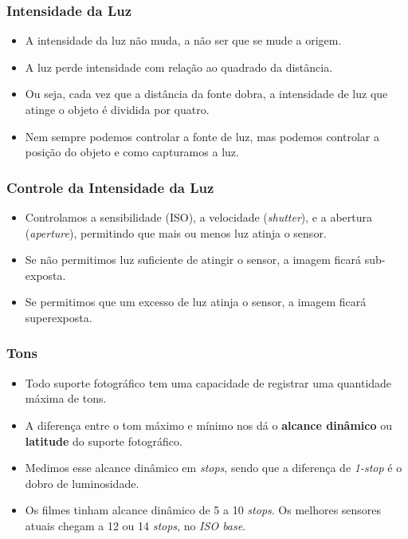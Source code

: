 
\begin{frame}
    \frametitle{Intensidade da Luz}
    \begin{itemize}
      \item A intensidade da luz não muda, a não ser que se mude a origem.
      \item A luz perde intensidade com relação ao quadrado da distância.
      \item Ou seja, cada vez que a distância da fonte dobra, a intensidade
      de luz que atinge o objeto é dividida por quatro.
      \item Nem sempre podemos controlar a fonte de luz, mas podemos controlar
      a posição do objeto e como capturamos a luz.
    \end{itemize}
\end{frame}

\begin{frame}
    \frametitle{Controle da Intensidade da Luz}
    \begin{itemize}
      \item Controlamos a sensibilidade (ISO), a velocidade (\textit{shutter}),
      e a abertura (\textit{aperture}), permitindo que mais ou menos luz atinja o sensor.
      \item Se não permitimos luz suficiente de atingir o sensor, a imagem ficará sub-exposta.
      \item Se permitimos que um excesso de luz atinja o sensor, a imagem ficará superexposta.
    \end{itemize}
\end{frame}




\begin{frame}
    \frametitle{Tons}
    \begin{itemize}
      \item Todo suporte fotográfico tem uma capacidade de registrar uma quantidade máxima de tons.
      \item A diferença entre o tom máximo e mínimo nos dá o \textbf{alcance dinâmico} ou \textbf{latitude}
      do suporte fotográfico.
      \item Medimos esse alcance dinâmico em \textit{stops}, sendo que a diferença de \textit{1-stop} é o dobro
      de luminosidade.
      \item Os filmes tinham alcance dinâmico de 5 a 10 \textit{stops}. Os melhores sensores atuais
      chegam a 12 ou 14 \textit{stops}, no \textit{ISO base}.
    \end{itemize}
\end{frame}

